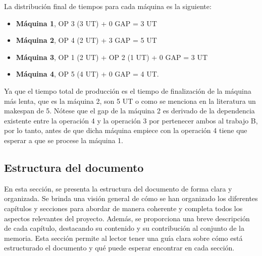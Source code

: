 La distribución final de tiempos para cada máquina es la siguiente: 
\begin{itemize}
    \item \textbf{Máquina 1}, OP 3 (3 UT) + 0 GAP = 3 UT 
    \item \textbf{Máquina 2}, OP 4 (2 UT) + 3 GAP = 5 UT 
    \item \textbf{Máquina 3}, OP 1 (2 UT) + OP 2 (1 UT) + 0 GAP = 3 UT 
    \item \textbf{Máquina 4}, OP 5 (4 UT) + 0 GAP = 4 UT. 
\end{itemize}

Ya que el tiempo total de producción es el tiempo de finalización de la máquina más lenta, 
que es la máquina 2, son 5 UT o como se menciona en la literatura un makespan de 5.
Nótese que el gap de la máquina 2 es derivado de la dependencia
existente entre la operación 4 y la operación 3 por pertenecer ambos al trabajo B, 
por lo tanto, antes de que dicha máquina empiece con la operación 4 tiene que esperar 
a que se procese la máquina 1.

\subsection{Estructura del documento}
En esta sección, se presenta la estructura del documento de forma clara y organizada. Se 
brinda una visión general de cómo se han organizado los diferentes capítulos y secciones 
para abordar de manera coherente y completa todos los aspectos relevantes del proyecto. 
Además, se proporciona una breve descripción de cada capítulo, destacando su contenido 
y su contribución al conjunto de la memoria. Esta sección permite al lector tener una 
guía clara sobre cómo está estructurado el documento y qué puede esperar encontrar en cada 
sección.

